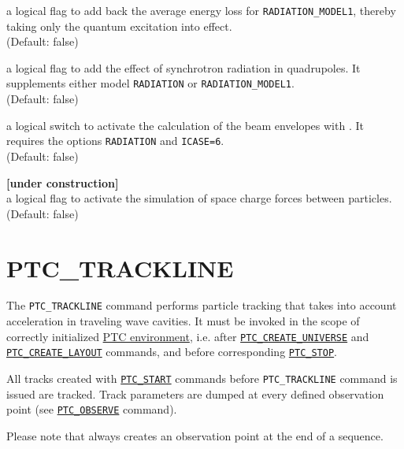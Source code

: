 \begin{madlist}
    a logical flag to add back the
   average energy loss for {\tt RADIATION\_MODEL1}, thereby taking only
   the quantum excitation into effect.\\ (Default: false)

    a logical flag to add the effect of
   synchrotron radiation in quadrupoles. It supplements either model
   {\tt RADIATION} or {\tt RADIATION\_MODEL1}. \\
   (Default: false)

    a logical switch to activate the calculation
   of the beam envelopes with \ptc. It requires the options
   {\tt RADIATION} and {\tt ICASE=6}.\\
   (Default: false)

    {\bf [under construction]}\\
     a logical flag to activate the simulation of space charge forces
     between particles. \\ (Default: false)  
\end{madlist}


\section{PTC\_TRACKLINE}
\label{sec:ptc_trackline}

The {\tt PTC\_TRACKLINE} command performs particle tracking that takes
into account acceleration in traveling wave cavities. 
It must be invoked in the scope of correctly initialized
\hyperref[chap:ptc_general]{PTC environment}, 
i.e. after \hyperref[sec:ptc_create_universe]{\tt PTC\_CREATE\_UNIVERSE}
and \hyperref[sec:ptc_create_layout]{\tt PTC\_CREATE\_LAYOUT} commands, and before
corresponding \hyperref[sec:ptc_stop]{\tt PTC\_STOP}. 

All tracks created with \hyperref[sec:ptc_start]{\tt PTC\_START}
commands before {\tt PTC\_TRACKLINE} command is issued are 
tracked. Track parameters are dumped at every defined observation point
(see \hyperref[sec:ptc_observe]{\tt PTC\_OBSERVE} command). 

Please note that \madx always creates an observation point at the end of a
sequence.


